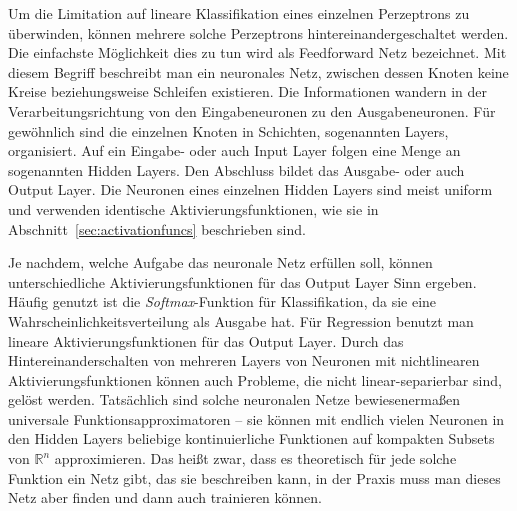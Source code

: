 
Um die Limitation auf lineare Klassifikation eines einzelnen Perzeptrons zu überwinden, können mehrere solche Perzeptrons hintereinandergeschaltet werden. 
Die einfachste Möglichkeit dies zu tun wird als Feedforward Netz bezeichnet.
Mit diesem Begriff beschreibt man ein neuronales Netz, zwischen dessen Knoten keine Kreise beziehungsweise Schleifen existieren.
Die Informationen wandern in der Verarbeitungsrichtung von den Eingabeneuronen zu den Ausgabeneuronen.
Für gewöhnlich sind die einzelnen Knoten in Schichten, sogenannten Layers, organisiert.
Auf ein Eingabe- oder auch Input Layer folgen eine Menge an sogenannten Hidden Layers.
Den Abschluss bildet das Ausgabe- oder auch Output Layer.
Die Neuronen eines einzelnen Hidden Layers sind meist uniform und verwenden identische Aktivierungsfunktionen, wie sie in Abschnitt~\ref{sec:activationfuncs} beschrieben sind.

Je nachdem, welche Aufgabe das neuronale Netz erfüllen soll, können unterschiedliche Aktivierungsfunktionen für das Output Layer Sinn ergeben.
Häufig genutzt ist die \textit{Softmax}-Funktion für Klassifikation, da sie eine Wahrscheinlichkeitsverteilung als Ausgabe hat.
Für Regression benutzt man lineare Aktivierungsfunktionen für das Output Layer. 
Durch das Hintereinanderschalten von mehreren Layers von Neuronen mit nichtlinearen Aktivierungsfunktionen können auch Probleme, die nicht linear-separierbar sind, gelöst werden.
Tatsächlich sind solche neuronalen Netze bewiesenermaßen universale Funktionsapproximatoren -- 
sie können mit endlich vielen Neuronen in den Hidden Layers beliebige kontinuierliche Funktionen auf kompakten Subsets von \(\mathbb{R}^n\) approximieren.
Das heißt zwar, dass es theoretisch für jede solche Funktion ein Netz gibt, das sie beschreiben kann, in der Praxis muss man dieses Netz aber finden und dann auch trainieren können.

